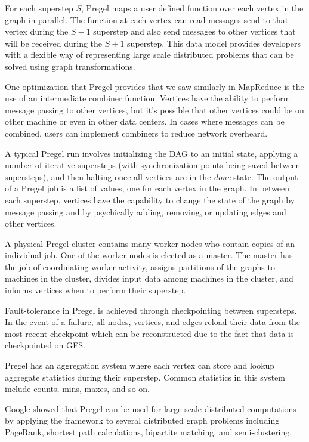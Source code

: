 \documentclass[]{article}
\begin{document}
For each superstep $S$, Pregel maps a user defined function over each vertex in the graph in parallel. The function at each vertex can read messages send to that vertex during the $S-1$ superstep and also send messages to other vertices that will be received during the $S+1$ superstep. This data model provides developers with a flexible way of representing large scale distributed problems that can be solved using graph transformations. 

One optimization that Pregel provides that we saw similarly in MapReduce is the use of an intermediate combiner function. Vertices have the ability to perform message passing to other vertices, but it's possible that other vertices could be on other machine or even in other data centers. In cases where messages can be combined, users can implement combiners to reduce network overheard.

A typical Pregel run involves initializing the DAG to an initial state, applying a number of iterative supersteps (with synchronization points being saved between supersteps), and then halting once all vertices are in the \textit{done} state. The output of a Pregel job is a list of values, one for each vertex in the graph. In between each superstep, vertices have the capability to change the state of the graph by message passing and by psychically adding, removing, or updating edges and other vertices.

A physical Pregel cluster contains many worker nodes who contain copies of an individual job. One of the worker nodes is elected as a master. The master has the job of coordinating worker activity, assigns partitions of the graphs to machines in the cluster, divides input data among machines in the cluster, and informs vertices when to perform their superstep.

Fault-tolerance in Pregel is achieved through checkpointing between supersteps. In the event of a failure, all nodes, vertices, and edges reload their data from the most recent checkpoint which can be reconstructed due to the fact that data is checkpointed on GFS. 

Pregel has an aggregation system where each vertex can store and lookup aggregate statistics during their superstep. Common statistics in this system include counts, mins, maxes, and so on.

Google showed that Pregel can be used for large scale distributed computations by applying the framework to several distributed graph problems including PageRank, shortest path calculations, bipartite matching, and semi-clustering.
\end{document}
